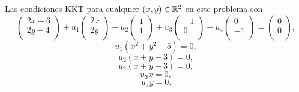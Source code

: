 Las condiciones KKT para cualquier $(x, y) \in \mathbb{R}^2$ en este problema son
\begin{equation*}
    \begin{pmatrix}
        2x - 6 \\
        2y - 4 \\
    \end{pmatrix}
    +
    u_1
    \begin{pmatrix}
        2x \\
        2y \\
    \end{pmatrix}
    + u_2
    \begin{pmatrix}
        1 \\
        1 \\
    \end{pmatrix}
    + u_3
    \begin{pmatrix}
        -1 \\
        0 \\
    \end{pmatrix}
    + u_4
    \begin{pmatrix}
        0 \\
        -1 \\
    \end{pmatrix}
    =
    \begin{pmatrix}
        0 \\
        0 \\
    \end{pmatrix},
\end{equation*}
\begin{equation*}
    u_1(x^2 + y^2 - 5) = 0,
\end{equation*}
\begin{equation*}
    u_2(x + y - 3) = 0,
\end{equation*}
\begin{equation*}
    u_2(x + y - 3) = 0,
\end{equation*}
\begin{equation*}
    u_3 x = 0,
\end{equation*}
\begin{equation*}
    u_4 y = 0.
\end{equation*}

